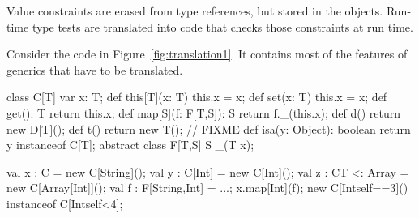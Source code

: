 Value constraints are erased from type references, but
stored in the objects.  Run-time type tests are translated
into code that checks those constraints at run time.


Consider the code in Figure~\ref{fig:translation1}.  It contains most of the
features of generics that have to be translated.
\begin{figure*}[tp]
{\footnotesize
\begin{xten}
class C[T] {
    var x: T;
    def this[T](x: T) { this.x = x; }
    def set(x: T) { this.x = x; }
    def get(): T { return this.x; }
    def map[S](f: F[T,S]): S { return f._(this.x); }
    def d() { return new D[T](); }
    def t() { return new T(); } // FIXME
    def isa(y: Object): boolean { return y instanceof C[T]; }
}
abstract class F[T,S] { S _(T x); }

val x : C = new C[String]();
val y : C[Int] = new C[Int]();
val z : C{T <: Array} = new C[Array[Int]]();
val f : F[String,Int] = ...;
x.map[Int](f);
new C[Int{self==3}]() instanceof C[Int{self<4}];
\end{xten}}
\caption{Code to translate}
\label{fig:translation1}
\end{figure*}

